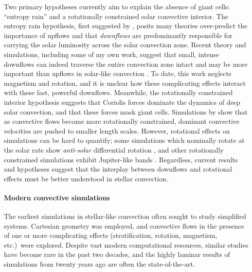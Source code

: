 Two primary hypotheses currently aim to explain the absence of giant cells: ``entropy rain'' and a rotationally constrained solar convective interior.
The entropy rain hypothesis, first suggested by \cite{spruit1997}, posits many theories over-predict the importance of upflows and that \emph{downflows} are predominantly responsible for carrying the solar luminosity across the solar convection zone.
Recent theory and simulations, including some of my own work, suggest that small, intense downflows can indeed traverse the entire convection zone intact and may be more important than upflows in solar-like convection \cite{brandenburg2016, kapyla&all2017, andersLB2019}.
To date, this work neglects magnetism and rotation, and it is unclear how these complicating effects interact with these fast, powerful downflows.
Meanwhile, the rotationally constrained interior hypothesis suggests that Coriolis forces dominate the dynamics of deep solar convection, and that these forces mask giant cells.
Simulations by \cite{featherstone&hindman2016} show that as convective flows become more rotationally constrained, dominant convective velocities are pushed to smaller length scales.
However, rotational effects on simulations can be hard to quantify; some simulations which nominally rotate at the solar rate show \emph{anti-solar} differential rotation \cite{gastine&all2014}, and other rotationally constrained simulations exhibit Jupiter-like bands \cite{brun&all2017}.
Regardless, current results and hypotheses suggest that the interplay between downflows and rotational effects must be better understood in stellar convection.

\paragraph{Modern convective simulations}
\label{sct:modern_simulations}
The earliest simulations in stellar-like convection \cite{graham1975, hurlburt&all1984, cattaneo&all1991, brummell&all1996, brummell&all1998} often sought to study simplified systems.
Cartesian geometry was employed, and convective flows in the presence of one or more complicating effects (stratification, rotation, magnetism, etc.)~were explored.
Despite vast modern computational resources, similar studies \cite[e.g.,][]{wood&brummell2012, anders&brown2017, wood&brummell2018} have become rare in the past two decades, and the highly laminar results of simulations from twenty years ago are often the state-of-the-art.

